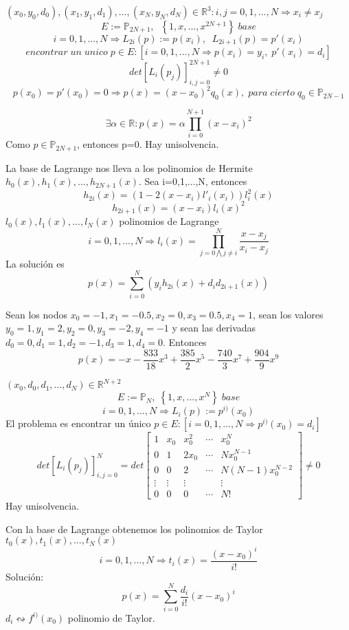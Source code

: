 \begin{nlist}
\item $(x_0,y_0,d_0),(x_1,y_1,d_1),...,(x_N,y_N,d_N) \in \mathbb{R}^3 : i,j=0,1,...,N \Rightarrow x_i \neq x_j $
\[ E := \mathbb{P}_{2N+1}, \; \; \left\lbrace 1,x,...,x^{2N+1} \right\rbrace \; base \]
\[ i = 0,1,...,N \Rightarrow L_{2i}(p) := p(x_i), \; \; L_{2i+1}(p) = p'(x_i) \]
\[ encontrar \; un \; unico \; p \in E : \left[ i = 0,1,...,N \Rightarrow p(x_i)=y_i, \; p'(x_i) = d_i \right] \]
\[ det \left[ L_i(p_j) \right] _{i,j=0}^{2N+1} \neq 0 \]
\[ p(x_0) = p'(x_0) = 0 \Rightarrow p(x)=(x-x_0)^2q_0(x), \; para \; cierto \; q_0 \in \mathbb{P}_{2N-1} \]

\[ \exists \alpha \in \mathbb{R}: p(x) = \alpha \prod_{i=0}^{N+1}(x-x_i)^2 \]
Como $p \in \mathbb{P}_{2N+1}$, entonces p=0. Hay unisolvencia.

La base de Lagrange nos lleva a los polinomios de Hermite {$h_0(x),h_1(x),...,h_{2N+1}(x)$}.
Sea i=0,1,...,N, entonces
\[ h_{2i}(x)=(1-2(x-x_i)l'_i(x_i))l_i^2(x) \]
\[ h_{2i+1}(x) = (x-x_i)l_i(x)^2 \]
{$l_0(x),l_1(x),...,l_N(x)$} polinomios de Lagrange
\[ i=0,1,...,N \Rightarrow l_i(x) = \prod_{j=0 \bigwedge j\neq i}^N \frac{x-x_j}{x_i-x_j}\]
La solución es
\[p(x) = \sum_{i=0}^N (y_ih_{2i}(x) + d_id_{2i+1}(x)) \]

	\begin{ejemplo}
	Sean los nodos $x_0=-1, x_1=-0.5, x_2=0, x_3=0.5, x_4=1$, sean los valores $y_0=1, y_1=2, y_2=0, y_3=-2, y_4=-1$ y sean las derivadas $d_0=0, d_1=1, d_2=-1, d_3=1, d_4=0$. Entonces
	\[ p(x) = -x - \frac{833}{18}x^3 + \frac{385}{2}x^5 - \frac{740}{3}x^7 + \frac{904}{9}x^9 \]
	\end{ejemplo}

\item $(x_0,d_0,d_1,...,d_N) \in \mathbb{R}^{N+2}$
\[ E:= \mathbb{P}_N, \; \left\lbrace 1,x,...,x^N \right\rbrace \; base \]
\[ i=0,1,...,N \Rightarrow L_i(p) := p^{i)}(x_0) \]
El problema es encontrar un único $p \in E : \left[ i=0,1,...,N \Rightarrow p^{i)}(x_0) = d_i \right] $
\[ det \left[ L_i(p_j) \right] _{i,j=0}^N = det \left[
\begin{array}{ccccc}
1 & x_0 & x_0^2 & \cdots & x_0^N \\
0 & 1 & 2x_0 & \cdots & Nx_0^{N-1} \\
0 & 0 & 2 & \cdots & N(N-1)x_0^{N-2} \\
\vdots & \vdots & \vdots & & \vdots \\
0 & 0 & 0 & \cdots & N!
\end{array}
\right] \neq 0 \]
Hay unisolvencia.

Con la base de Lagrange obtenemos los polinomios de Taylor {$t_0(x),t_1(x),...,t_N(x)$}
\[i=0,1,...,N \Rightarrow t_i(x) = \frac{(x-x_0)^i}{i!} \]
Solución:
\[ p(x) = \sum_{i=0}^N \frac{d_i}{i!}(x-x_0)^i \]
$d_i \leftrightsquigarrow f^{i)}(x_0)$ polinomio de Taylor.

\end{nlist}

